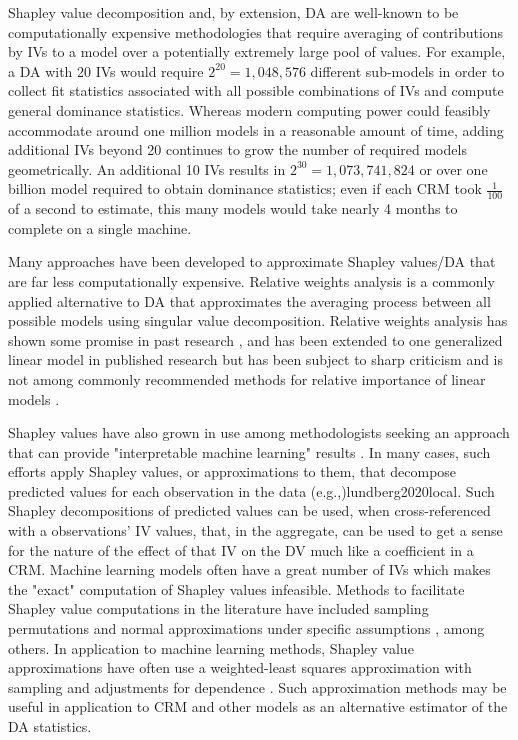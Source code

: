 \documentclass[ShortAfour,times,sageapa]{sagej}
\begin{document}
	Shapley value decomposition and, by extension, DA are well-known to be computationally expensive methodologies that require averaging of contributions by IVs to a model over a potentially extremely large pool of values.
	For example, a DA with 20 IVs would require $2^{20} = 1,048,576$ different sub-models in order to collect fit statistics associated with all possible combinations of IVs and compute general dominance statistics.
	Whereas modern computing power could feasibly accommodate around one million models in a reasonable amount of time, adding additional IVs beyond 20 continues to grow the number of required models geometrically. 
	An additional 10 IVs results in $2^{30} = 1,073,741,824$ or over one billion model required to obtain dominance statistics; even if each CRM took $\frac{1}{100}$ of a second to estimate, this many models would take nearly 4 months to complete on a single machine.
	
	Many approaches have been developed to approximate Shapley values/DA that are far less computationally expensive. 
	Relative weights analysis \cite{johnson2000heuristic} is a commonly applied alternative to DA that approximates the averaging process between all possible models using singular value decomposition.
	Relative weights analysis has shown some promise in past research \cite{lebreton2007multidimensional}, and has been extended to one generalized linear model in published research \cite[i.e., logit regression]{tonidandel2011relative} but has been subject to sharp criticism \cite{thomas2014johnson} and is not among commonly recommended methods for relative importance of linear models \cite{gromping2007estimators}. 
		
	Shapley values have also grown in use among methodologists seeking an approach that can provide "interpretable machine learning" results \cite{molnar2020interpretable}.
	In many cases, such efforts apply Shapley values, or approximations to them, that decompose predicted values for each observation in the data \shortcite(e.g.,){lundberg2020local}.
	Such Shapley decompositions of predicted values can be used, when cross-referenced with a observations' IV values, that, in the aggregate, can be used to get a sense for the nature of the effect of that IV on the DV much like a coefficient in a CRM.
	Machine learning models often have a great number of IVs which makes the "exact" computation of Shapley values infeasible.
	Methods to facilitate Shapley value computations in the literature have included sampling permutations \cite{castro2009polynomial} and normal approximations under specific assumptions \cite{fatima2008linear}, among others.
	In application to machine learning methods, Shapley value approximations have often use a weighted-least squares approximation with sampling and adjustments for dependence \cite{sellereite2020shapr,aas2021explaining}. 
	Such approximation methods may be useful in application to CRM and other models as an alternative estimator of the DA statistics.
	
\end{document}
